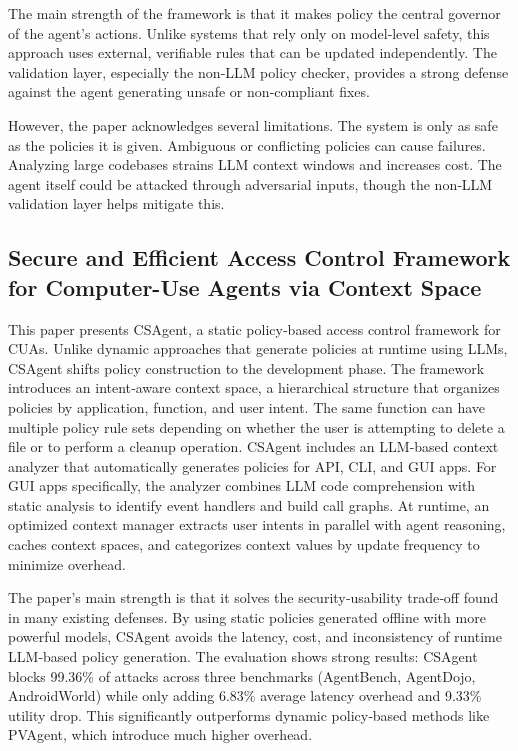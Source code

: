 \documentclass[a4paper]{report}
\begin{document}
The main strength of the framework is that it makes policy the central governor of the agent's actions. Unlike systems that rely only on model‑level safety, this approach uses external, verifiable rules that can be updated independently. The validation layer, especially the non‑LLM policy checker, provides a strong defense against the agent generating unsafe or non‑compliant fixes.

However, the paper acknowledges several limitations. The system is only as safe as the policies it is given. Ambiguous or conflicting policies can cause failures. Analyzing large codebases strains LLM context windows and increases cost. The agent itself could be attacked through adversarial inputs, though the non‑LLM validation layer helps mitigate this.

\subsection{Secure and Efficient Access Control Framework for Computer-Use Agents via Context Space}
This paper \cite{gong2025secure} presents CSAgent, a static policy‑based access control framework for CUAs. Unlike dynamic approaches that generate policies at runtime using LLMs, CSAgent shifts policy construction to the development phase. The framework introduces an intent‑aware context space, a hierarchical structure that organizes policies by application, function, and user intent. The same function can have multiple policy rule sets depending on whether the user is attempting to delete a file or to perform a cleanup operation. CSAgent includes an LLM‑based context analyzer that automatically generates policies for API, CLI, and GUI apps. For GUI apps specifically, the analyzer combines LLM code comprehension with static analysis to identify event handlers and build call graphs. At runtime, an optimized context manager extracts user intents in parallel with agent reasoning, caches context spaces, and categorizes context values by update frequency to minimize overhead.

The paper's main strength is that it solves the security‑usability trade‑off found in many existing defenses. By using static policies generated offline with more powerful models, CSAgent avoids the latency, cost, and inconsistency of runtime LLM‑based policy generation. The evaluation shows strong results: CSAgent blocks 99.36\% of attacks across three benchmarks (AgentBench, AgentDojo, AndroidWorld) while only adding 6.83\% average latency overhead and 9.33\% utility drop. This significantly outperforms dynamic policy‑based methods like PVAgent, which introduce much higher overhead.
\end{document}
